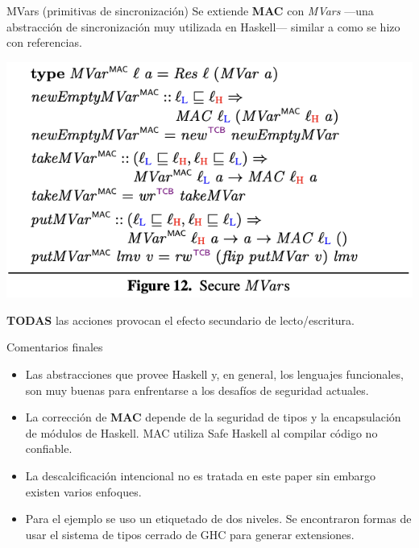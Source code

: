\documentclass{beamer}
\begin{document}
\begin{frame}{MVars (primitivas de sincronización)}
    Se extiende \textbf{MAC} con \textit{MVars} ---una abstracción de sincronización muy utilizada en Haskell--- similar a como se hizo con referencias.
    
    \begin{center}
        \includegraphics[scale=0.7]{figure12.png}
    \end{center}

    \textbf{TODAS} las acciones provocan el efecto secundario de lecto/escritura.
\end{frame}

\begin{frame}{Comentarios finales}
    \begin{itemize}
        \item<1-> Las abstracciones que provee Haskell y, en general, los lenguajes funcionales, son muy buenas para enfrentarse a los desafíos de seguridad actuales.

        \item<2-> La corrección de \textbf{MAC} depende de la seguridad de tipos y la encapsulación de módulos de Haskell. MAC utiliza Safe Haskell al compilar código no confiable.
        
        \item<3-> La descalcificación intencional no es tratada en este paper sin embargo existen varios enfoques.
        
        \item<4-> Para el ejemplo se uso un etiquetado de dos niveles. Se encontraron formas de usar el sistema de tipos cerrado de GHC para generar extensiones.
    \end{itemize}
\end{frame}
\end{document}
